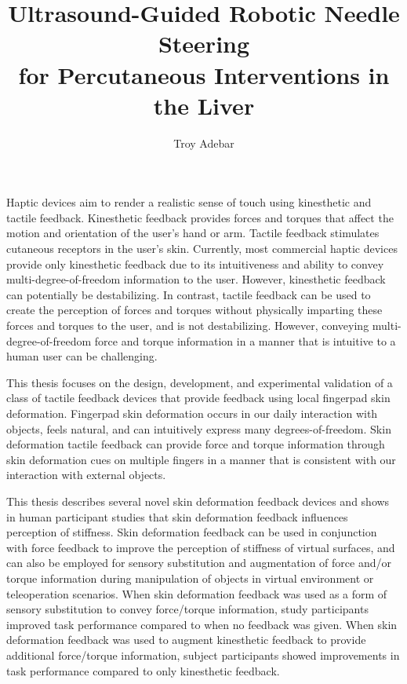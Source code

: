 \documentclass[12pt,twoside]{report}
\begin{document}
\renewcommand{\thepage}{\roman{page}}%

\title{Ultrasound-Guided Robotic Needle Steering\\
            for Percutaneous Interventions in the Liver}
\author{Troy Adebar}
 
\beforepreface

Haptic devices aim to render a realistic sense of touch using kinesthetic and tactile feedback. Kinesthetic feedback provides forces and torques that affect the motion and orientation of the user’s hand or arm. Tactile feedback stimulates cutaneous receptors in the user’s skin. Currently, most commercial haptic devices provide only kinesthetic feedback due to its intuitiveness and ability to convey multi-degree-of-freedom information to the user. However, kinesthetic feedback can potentially be destabilizing. In contrast, tactile feedback can be used to create the perception of forces and torques without physically imparting these forces and torques to the user, and is not destabilizing. However, conveying multi-degree-of-freedom force and torque information in a manner that is intuitive to a human user can be challenging. 

This thesis focuses on the design, development, and experimental validation of a class of tactile feedback devices that provide feedback using local fingerpad skin deformation. Fingerpad skin deformation occurs in our daily interaction with objects, feels natural, and can intuitively express many degrees-of-freedom. Skin deformation tactile feedback can provide force and torque information through skin deformation cues on multiple fingers in a manner that is consistent with our interaction with external objects.

This thesis describes several novel skin deformation feedback devices and shows in human participant studies that skin deformation feedback influences perception of stiffness. Skin deformation feedback can be used in conjunction with force feedback to improve the perception of stiffness of virtual surfaces, and can also be employed for sensory substitution and augmentation of force and/or torque information during manipulation of objects in virtual environment or teleoperation scenarios. When skin deformation feedback was used as a form of sensory substitution to convey force/torque information, study participants improved task performance compared to when no feedback was given. When skin deformation feedback was used to augment kinesthetic feedback to provide additional force/torque information, subject participants showed improvements in task performance compared to only kinesthetic feedback.
\end{document}
